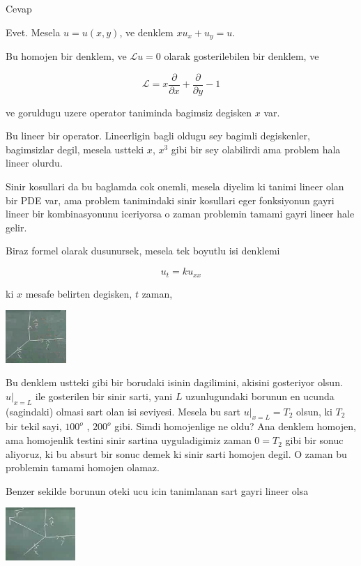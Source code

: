\documentclass[12pt,fleqn]{article}
\begin{document}
Cevap 

Evet. Mesela $u=u(x,y)$, ve denklem $xu_x + u_y = u$. 

Bu homojen bir denklem, ve $\mathcal{L} u = 0$ olarak gosterilebilen bir
denklem, ve 

\[ \mathcal{L} = x\frac{\partial }{\partial x} + 
\frac{\partial }{\partial y} - 1
\]

ve goruldugu uzere operator taniminda bagimsiz degisken $x$ var.

Bu lineer bir operator. Lineerligin bagli oldugu sey bagimli degiskenler,
bagimsizlar degil, mesela ustteki $x$, $x^3$ gibi bir sey olabilirdi ama
problem hala lineer olurdu. 

Sinir kosullari da bu baglamda cok onemli, mesela diyelim ki tanimi lineer
olan bir PDE var, ama problem tanimindaki sinir kosullari eger fonksiyonun
gayri lineer bir kombinasyonunu iceriyorsa o zaman problemin tamami gayri
lineer hale gelir. 

Biraz formel olarak dusunursek, mesela tek boyutlu isi denklemi

\[ u_t = k u_{xx} \]

ki $x$ mesafe belirten degisken, $t$ zaman, 

\includegraphics[height=2cm]{1_6.png}

Bu denklem ustteki gibi bir borudaki isinin dagilimini, akisini gosteriyor
olsun. $u|_{x=L}$ ile gosterilen bir sinir sarti, yani $L$ uzunlugundaki
borunun en ucunda (sagindaki) olmasi sart olan isi seviyesi. Mesela bu sart
$u|_{x=L} = T_2$ olsun, ki $T_2$ bir tekil sayi, $100^o$ , $200^o$ gibi. Simdi homojenlige
ne oldu? Ana denklem homojen, ama homojenlik testini sinir sartina uyguladigimiz
zaman $0 = T_2$ gibi bir sonuc aliyoruz, ki bu absurt bir sonuc demek ki sinir
sarti homojen degil. O zaman bu problemin tamami homojen olamaz. 

Benzer sekilde borunun oteki ucu icin tanimlanan sart gayri lineer olsa

\includegraphics[height=2cm]{1_7.png}
\end{document}
